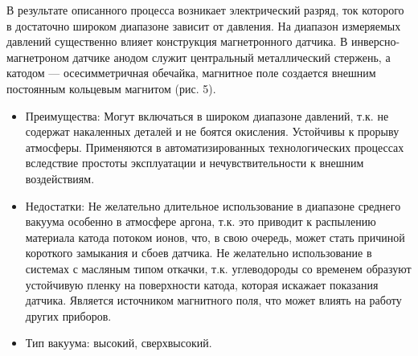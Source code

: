 \documentclass[a4paper,12pt]{article}
\theoremstyle{plain} %
\theoremstyle{definition} %
\theoremstyle{remark} %
\begin{document}
В результате описанного процесса возникает электрический разряд, ток которого в достаточно широком диапазоне зависит от давления. На диапазон измеряемых давлений существенно влияет конструкция магнетронного датчика. В инверсно-магнетроном датчике анодом служит центральный металлический стержень, а катодом — осесимметричная обечайка, магнитное поле создается внешним постоянным кольцевым магнитом (рис. 5).
\begin{itemize}
	\item Преимущества: Могут включаться в широком диапазоне давлений, т.к. не содержат накаленных деталей и не боятся окисления. Устойчивы к прорыву атмосферы. Применяются в автоматизированных технологических процессах вследствие простоты эксплуатации и нечувствительности к внешним воздействиям.
	\item Недостатки: Не желательно длительное использование в диапазоне среднего вакуума особенно в атмосфере аргона, т.к. это приводит к распылению материала катода потоком ионов, что, в свою очередь, может стать причиной короткого замыкания и сбоев датчика. Не желательно использование в системах с масляным типом откачки, т.к. углеводороды со временем образуют устойчивую пленку на поверхности катода, которая искажает показания датчика. Является источником магнитного поля, что может влиять на работу других приборов.
	\item Тип вакуума: высокий, сверхвысокий.
\end{itemize}
\end{document}

